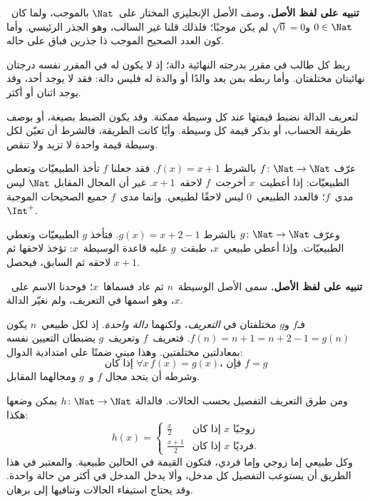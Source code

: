 \documentclass[../../../include/open-logic-section]{subfiles}
\begin{document}
\begin{explain}
\textbf{تنبيه على لفظ الأصل.} وصف الأصل الإنجليزي المختار على~$\Nat$
بالموجب، ولما كان~$0\in\Nat$ و$\sqrt{0}=0$ لم يكن موجبًا؛ فلذلك قلنا غير السالب، وهو الجذر
الرئيسي. وأما كون العدد الصحيح الموجب ذا جذرين فباق على حاله.
\end{explain}

\begin{ex}
ربط كل طالب في مقرر بدرجته النهائية دالة؛ إذ لا يكون له في المقرر
نفسه درجتان نهائيتان مختلفتان. وأما ربطه بمن يعد والدًا أو والدة
له فليس دالة: فقد لا يوجد أحد، وقد يوجد اثنان أو أكثر.
\end{ex}

\begin{explain}
لتعريف الدالة نضبط قيمتها عند كل وسيطة ممكنة. وقد يكون الضبط بصيغة،
أو بوصف طريقة الحساب، أو بذكر قيمة كل وسيطة. وأيًا كانت الطريقة،
فالشرط أن تعيّن لكل وسيطة قيمة واحدة لا تزيد ولا تنقص.
\end{explain}

\begin{ex}
عرّف $f \colon \Nat \to \Nat$ بالشرط $f(x) = x+1$.
فقد جعلنا $f$ تأخذ الطبيعيّات وتعطي الطبيعيّات: إذا أعطيت~$x$
أخرجت~$f$ لاحقه~$x+1$. غير أن المجال المقابل $\Nat$ ليس
مدى~$f$؛ فالعدد الطبيعي~$0$ ليس لاحقًا لطبيعي. وإنما مدى~$f$
جميع الصحيحات الموجبة $\Int^{+}$.
\end{ex}

\begin{ex}
وعرّف $g \colon \Nat \to \Nat$ بالشرط $g(x) = x+2-1$.
فتأخذ $g$ الطبيعيّات وتعطي الطبيعيّات. وإذا أعطي طبيعي~$x$،
طبقت~$g$ عليه قاعدة الوسيطة~$x$: تؤخذ لاحقها ثم لاحقه ثم السابق،
فيحصل $x+1$.
\end{ex}

\begin{explain}
\textbf{تنبيه على لفظ الأصل.} سمى الأصل الوسيطة~$n$ ثم عاد فسماها~$x$؛
فوحدنا الاسم على~$x$، وهو اسمها في التعريف، ولم نغيّر الدالة.
\end{explain}

\begin{explain}
فـ$f$ و$g$ مختلفتان في \emph{التعريف}، ولكنهما \emph{دالة واحدة}.
إذ لكل طبيعي~$n$ يكون $f(n) = n+1 = n+2-1 =
g(n)$. فتعريف~$f$ وتعريف~$g$ يضبطان التعيين نفسه بمعادلتين
مختلفتين. وهذا مبني ضمنًا على امتدادية الدوال:
\[
  \text{إذا كان }\forall x\, f(x) = g(x)\text{، فإن }f = g
\]
وشرطه أن يتحد مجال $f$ و~$g$ ومجالهما المقابل.
\end{explain}

\begin{ex}
ومن طرق التعريف التفصيل بحسب الحالات. فالدالة
$h \colon \Nat \to \Nat$ يمكن وضعها هكذا:
\[
h(x) =
\begin{cases}
  \frac{x}{2} & \text{إذا كان $x$ زوجيًا} \\
  \frac{x+1}{2} & \text{إذا كان $x$ فرديًا.}
\end{cases}
\]
وكل طبيعي إما زوجي وإما فردي، فتكون القيمة في الحالين طبيعية.
والمعتبر في هذا الطريق أن يستوعب التفصيل كل مدخل، وألا يدخل
المدخل في أكثر من حالة واحدة. وقد يحتاج استيفاء الحالات
وتنافيها إلى برهان.
\end{ex}
\end{document}
